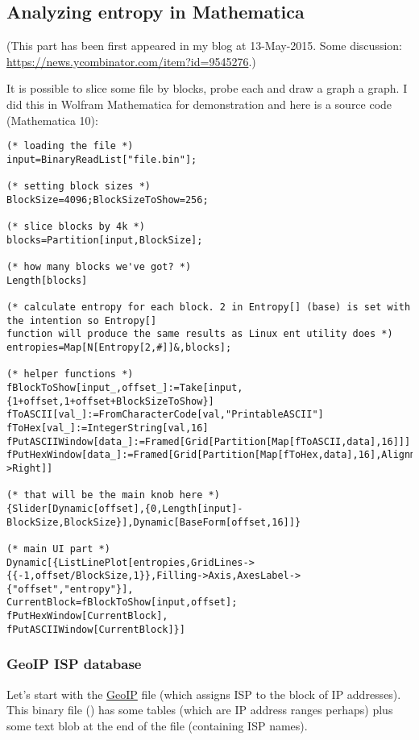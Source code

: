 \subsection{Analyzing entropy in Mathematica}

(This part has been first appeared in my blog at 13-May-2015.
Some discussion: \url{https://news.ycombinator.com/item?id=9545276}.)

It is possible to slice some file by blocks, probe each and draw a graph a graph.
I did this in Wolfram Mathematica for demonstration and here is a source code (Mathematica 10):

\begin{lstlisting}
(* loading the file *)
input=BinaryReadList["file.bin"];

(* setting block sizes *)
BlockSize=4096;BlockSizeToShow=256;

(* slice blocks by 4k *)
blocks=Partition[input,BlockSize];

(* how many blocks we've got? *)
Length[blocks]

(* calculate entropy for each block. 2 in Entropy[] (base) is set with the intention so Entropy[] 
function will produce the same results as Linux ent utility does *)
entropies=Map[N[Entropy[2,#]]&,blocks];

(* helper functions *)
fBlockToShow[input_,offset_]:=Take[input,{1+offset,1+offset+BlockSizeToShow}]
fToASCII[val_]:=FromCharacterCode[val,"PrintableASCII"]
fToHex[val_]:=IntegerString[val,16]
fPutASCIIWindow[data_]:=Framed[Grid[Partition[Map[fToASCII,data],16]]]
fPutHexWindow[data_]:=Framed[Grid[Partition[Map[fToHex,data],16],Alignment->Right]]

(* that will be the main knob here *)
{Slider[Dynamic[offset],{0,Length[input]-BlockSize,BlockSize}],Dynamic[BaseForm[offset,16]]}

(* main UI part *)
Dynamic[{ListLinePlot[entropies,GridLines->{{-1,offset/BlockSize,1}},Filling->Axis,AxesLabel->{"offset","entropy"}],
CurrentBlock=fBlockToShow[input,offset];
fPutHexWindow[CurrentBlock],
fPutASCIIWindow[CurrentBlock]}]
\end{lstlisting}

\subsubsection{GeoIP ISP database}

Let's start with the \href{https://www.maxmind.com/en/geoip-demo}{GeoIP} file (which assigns ISP to the block of IP addresses).
This binary file () has some tables (which are IP address ranges perhaps) plus some text blob at the end of the file
(containing ISP names).

